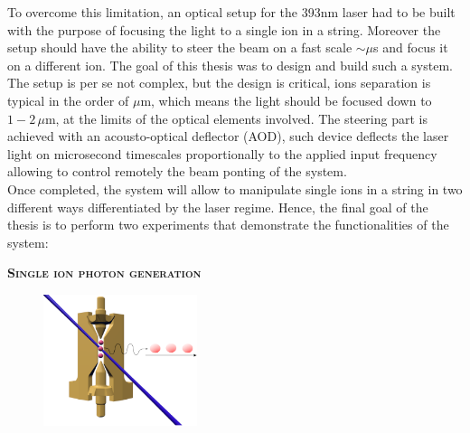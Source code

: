 \documentclass[english, a4paper, 12pt, twoside]{book}
\numberwithin{equation}{section} %
\begin{document}
To overcome this limitation, an optical setup for the 393nm laser had to be built with the purpose of focusing the light to a single ion in a string. Moreover the setup should have the ability to steer the beam on a fast scale $\sim\mu$s and focus it on a different ion. The goal of this thesis was to design and build such a system. The setup is per se not complex, but the design is critical, ions separation is typical in the order of $\mu$m, which means the light should be focused down to $1-2\,\mu$m, at the limits of the optical elements involved. The steering part is achieved with an acousto-optical deflector (AOD), such device deflects the laser light on microsecond timescales proportionally to the applied input frequency allowing to control remotely the beam ponting of the system.\\
Once completed, the system will allow to manipulate single ions in a string in two different ways differentiated by the laser regime. Hence, the final goal of the thesis is to perform two experiments that demonstrate the functionalities of the system:\vspace{-1em}\newline
\begin{center}{\large\textbf{\textsc{Single ion photon generation}}}\end{center}
\begin{figure}
  \begin{center}
    \includegraphics[width=0.4\textwidth]{photongeneration2}
  \end{center}
\end{figure}
\end{document}
